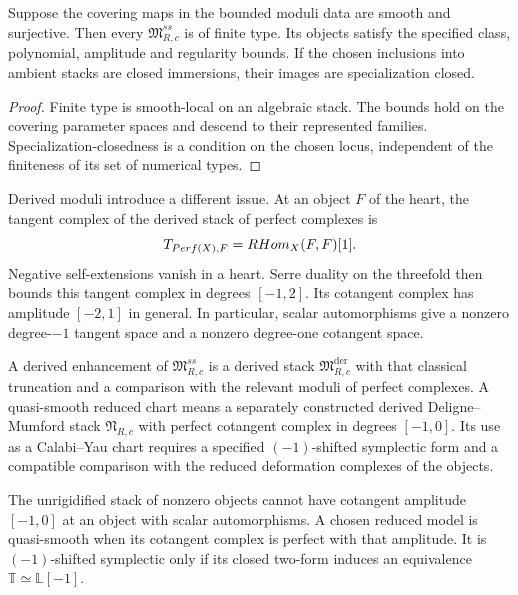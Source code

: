\begin{proposition}
\label{prop:retained-finite-type-semistable-substacks}
\label{prop:retained-finite-class-bounds}
Suppose the covering maps in the bounded moduli data are smooth and
surjective.  Then every $\mathfrak M^{ss}_{R,c}$ is of finite type.
Its objects satisfy the specified class, polynomial, amplitude and
regularity bounds.  If the chosen inclusions into ambient stacks are closed immersions,
their images are specialization closed.
\end{proposition}

\begin{proof}
Finite type is smooth-local on an algebraic stack.  The bounds hold
on the covering parameter spaces and descend to their represented
families.  Specialization-closedness is a condition on the chosen
locus, independent of the finiteness of its set of numerical types.
\end{proof}

Derived moduli introduce a different issue.  At an object $F$ of the
heart, the tangent complex of the derived stack of perfect complexes
is
\[
T_{Perf(X),F}=RHom_X(F,F)[1].
\]
Negative self-extensions vanish in a heart.  Serre duality on the
threefold then bounds this tangent complex in degrees $[-1,2]$.
Its cotangent complex has amplitude $[-2,1]$ in general.  In
particular, scalar automorphisms give a nonzero degree-$-1$ tangent
space and a nonzero degree-one cotangent space.

\begin{definition}
\label{def:retained-quasi-smooth-derived-enhancement-datum}
A derived enhancement of $\mathfrak M^{ss}_{R,c}$ is a derived stack
$\mathfrak M^{\mathrm{der}}_{R,c}$ with that classical truncation and
a comparison with the relevant moduli of perfect complexes.
A quasi-smooth reduced chart means a separately constructed derived
Deligne--Mumford stack $\mathfrak N_{R,c}$ with perfect cotangent
complex in degrees $[-1,0]$.  Its use as a Calabi--Yau chart requires
a specified $(-1)$-shifted symplectic form and a compatible comparison
with the reduced deformation complexes of the objects.
\end{definition}

\begin{proposition}
\label{prop:retained-quasi-smooth-derived-enhancements}
The unrigidified stack of nonzero objects cannot have cotangent
amplitude $[-1,0]$ at an object with scalar automorphisms.
A chosen reduced model is quasi-smooth when its cotangent complex
is perfect with that amplitude.  It is $(-1)$-shifted symplectic only
if its closed two-form induces an equivalence
$\mathbb T\simeq\mathbb L[-1]$.
\end{proposition}

